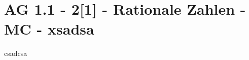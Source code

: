 \section{AG 1.1 - 2[1] - Rationale Zahlen - MC - xsadsa}

\begin{beispiel}[AG 1.1]{1}
csadcsa
\end{beispiel}
